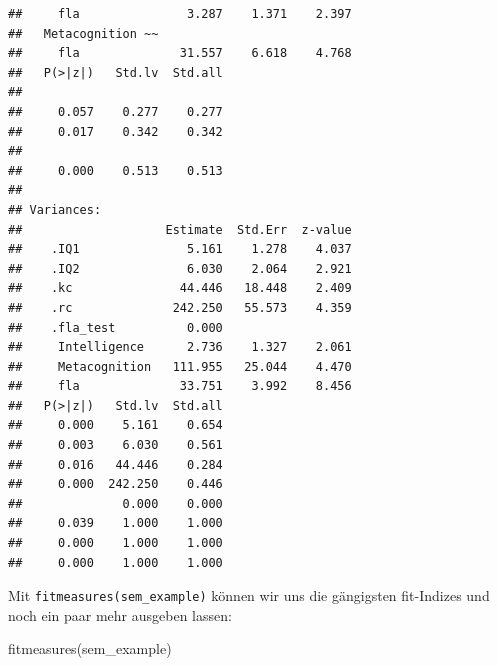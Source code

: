 \documentclass[
]{book}
\newenvironment{Shaded}{\begin{snugshade}}{\end{snugshade}}
\newcommand{\FunctionTok}[1]{\textcolor[rgb]{0.00,0.00,0.00}{#1}}
\newcommand{\NormalTok}[1]{#1}
\begin{document}
\begin{verbatim}
##     fla               3.287    1.371    2.397
##   Metacognition ~~                           
##     fla              31.557    6.618    4.768
##   P(>|z|)   Std.lv  Std.all
##                            
##     0.057    0.277    0.277
##     0.017    0.342    0.342
##                            
##     0.000    0.513    0.513
## 
## Variances:
##                    Estimate  Std.Err  z-value
##    .IQ1               5.161    1.278    4.037
##    .IQ2               6.030    2.064    2.921
##    .kc               44.446   18.448    2.409
##    .rc              242.250   55.573    4.359
##    .fla_test          0.000                  
##     Intelligence      2.736    1.327    2.061
##     Metacognition   111.955   25.044    4.470
##     fla              33.751    3.992    8.456
##   P(>|z|)   Std.lv  Std.all
##     0.000    5.161    0.654
##     0.003    6.030    0.561
##     0.016   44.446    0.284
##     0.000  242.250    0.446
##              0.000    0.000
##     0.039    1.000    1.000
##     0.000    1.000    1.000
##     0.000    1.000    1.000
\end{verbatim}

Mit \texttt{fitmeasures(sem\_example)} können wir uns die gängigsten fit-Indizes und noch ein paar mehr ausgeben lassen:

\begin{Shaded}
\begin{Highlighting}[]
\FunctionTok{fitmeasures}\NormalTok{(sem\_example)}
\end{Highlighting}
\end{Shaded}
\end{document}

